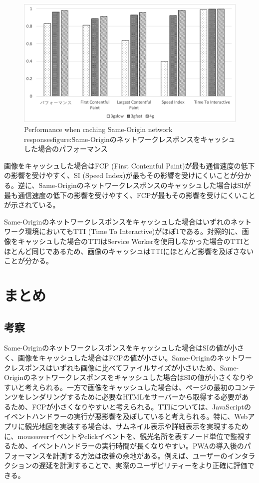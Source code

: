 \begin{multicols*}{2}
\begin{figure}
\end{figure}
\begin{figure}
  \centering
  \includegraphics[width=\textwidth]{images/service_worker_cache_same_origin.png}
  {Performance when caching Same-Origin network responses}{figure:Same-Originのネットワークレスポンスをキャッシュした場合のパフォーマンス}
\end{figure}
画像をキャッシュした場合はFCP (First Contentful Paint)が最も通信速度の低下の影響を受けやすく、SI (Speed Index)が最もその影響を受けにくいことが分かる。逆に、Same-Originのネットワークレスポンスのキャッシュした場合はSIが最も通信速度の低下の影響を受けやすく、FCPが最もその影響を受けにくいことが示されている。

Same-Originのネットワークレスポンスをキャッシュした場合はいずれのネットワーク環境においてもTTI (Time To Interactive)がほぼ1である。対照的に、画像をキャッシュした場合のTTIはService Workerを使用しなかった場合のTTIとほとんど同じであるため、画像のキャッシュはTTIにほとんど影響を及ぼさないことが分かる。

\section{まとめ}
\subsection{考察}
Same-Originのネットワークレスポンスをキャッシュした場合はSIの値が小さく、画像をキャッシュした場合はFCPの値が小さい。Same-Originのネットワークレスポンスはいずれも画像に比べてファイルサイズが小さいため、Same-Originのネットワークレスポンスをキャッシュした場合はSIの値が小さくなりやすいと考えられる。一方で画像をキャッシュした場合は、ページの最初のコンテンツをレンダリングするために必要なHTMLをサーバーから取得する必要があるため、FCPが小さくなりやすいと考えられる。TTIについては、JavaScriptのイベントハンドラーの実行が悪影響を及ぼしていると考えられる。特に、Webアプリに観光地図を実装する場合は、サムネイル表示や詳細表示を実現するために、mouseoverイベントやclickイベントを、観光名所を表すノード単位で監視するため、イベントハンドラーの実行時間が長くなりやすい。PWAの導入後のパフォーマンスを計測する方法は改善の余地がある。例えば、ユーザーのインタラクションの遅延を計測することで、実際のユーザビリティーをより正確に評価できる。


\end{multicols*}
